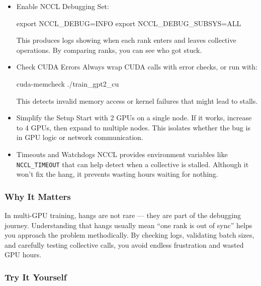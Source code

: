 \documentclass[
  letterpaper,
  DIV=11,
  numbers=noendperiod]{scrreprt}
\newenvironment{Shaded}{\begin{snugshade}}{\end{snugshade}}
\newcommand{\BuiltInTok}[1]{\textcolor[rgb]{0.00,0.23,0.31}{#1}}
\newcommand{\ExtensionTok}[1]{\textcolor[rgb]{0.00,0.23,0.31}{#1}}
\newcommand{\NormalTok}[1]{\textcolor[rgb]{0.00,0.23,0.31}{#1}}
\newcommand{\OperatorTok}[1]{\textcolor[rgb]{0.37,0.37,0.37}{#1}}
\newcommand{\VariableTok}[1]{\textcolor[rgb]{0.07,0.07,0.07}{#1}}
\begin{document}
\begin{itemize}
\item
  Enable NCCL Debugging Set:

\begin{Shaded}
\begin{Highlighting}[]
\BuiltInTok{export} \VariableTok{NCCL\_DEBUG}\OperatorTok{=}\NormalTok{INFO}
\BuiltInTok{export} \VariableTok{NCCL\_DEBUG\_SUBSYS}\OperatorTok{=}\NormalTok{ALL}
\end{Highlighting}
\end{Shaded}

  This produces logs showing when each rank enters and leaves collective
  operations. By comparing ranks, you can see who got stuck.
\item
  Check CUDA Errors Always wrap CUDA calls with error checks, or run
  with:

\begin{Shaded}
\begin{Highlighting}[]
\ExtensionTok{cuda{-}memcheck}\NormalTok{ ./train\_gpt2\_cu}
\end{Highlighting}
\end{Shaded}

  This detects invalid memory access or kernel failures that might lead
  to stalls.
\item
  Simplify the Setup Start with 2 GPUs on a single node. If it works,
  increase to 4 GPUs, then expand to multiple nodes. This isolates
  whether the bug is in GPU logic or network communication.
\item
  Timeouts and Watchdogs NCCL provides environment variables like
  \texttt{NCCL\_TIMEOUT} that can help detect when a collective is
  stalled. Although it won't fix the hang, it prevents wasting hours
  waiting for nothing.
\end{itemize}

\subsubsection{Why It Matters}\label{why-it-matters-51}

In multi-GPU training, hangs are not rare --- they are part of the
debugging journey. Understanding that hangs usually mean ``one rank is
out of sync'' helps you approach the problem methodically. By checking
logs, validating batch sizes, and carefully testing collective calls,
you avoid endless frustration and wasted GPU hours.

\subsubsection{Try It Yourself}\label{try-it-yourself-65}
\end{document}
